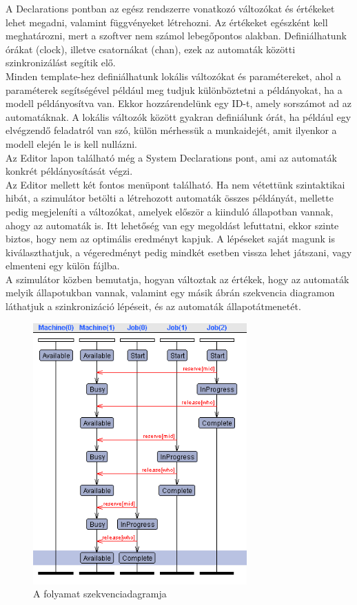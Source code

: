 \documentclass {report}
\begin{document}
A  Declarations pontban az egész rendszerre vonatkozó változókat és értékeket lehet megadni, valamint függvényeket létrehozni. Az értékeket egészként kell meghatározni, mert a szoftver nem számol lebegőpontos alakban. Definiálhatunk órákat (clock), illetve csatornákat (chan), ezek az automaták közötti szinkronizálást segítik elő.\\
Minden template-hez definiálhatunk lokális változókat és paramétereket, ahol a paraméterek segítségével például meg tudjuk különböztetni a példányokat, ha a modell példányosítva van. Ekkor hozzárendelünk egy ID-t, amely sorszámot ad az automatáknak. A lokális változók között gyakran definiálunk órát, ha például egy elvégzendő feladatról van szó, külön mérhessük a munkaidejét, amit ilyenkor a modell elején le is kell nullázni.\\ 
Az Editor lapon található még a System Declarations pont, ami az automaták konkrét példányosítását végzi.\\
Az Editor mellett két fontos menüpont található. Ha nem vétettünk szintaktikai hibát, a szimulátor betölti a létrehozott automaták összes példányát, mellette pedig megjeleníti a változókat, amelyek először a kiinduló állapotban vannak, ahogy az automaták is. Itt lehetőség van egy megoldást lefuttatni, ekkor szinte biztos, hogy nem az optimális eredményt kapjuk. A lépéseket saját magunk is kiválaszthatjuk, a végeredményt pedig mindkét esetben vissza lehet játszani, vagy elmenteni egy külön fájlba.  \\
A szimulátor közben bemutatja, hogyan változtak az értékek, hogy az automaták melyik állapotukban vannak, valamint egy másik ábrán szekvencia diagramon láthatjuk a szinkronizáció lépéseit, és az automaták állapotátmenetét.\\
\begin{figure}[htpb]
\begin{center}
\includegraphics[height=10cm]{szekvencia}
\caption{A folyamat szekvenciadagramja}
\end{center}
\end{figure}
\end{document}
